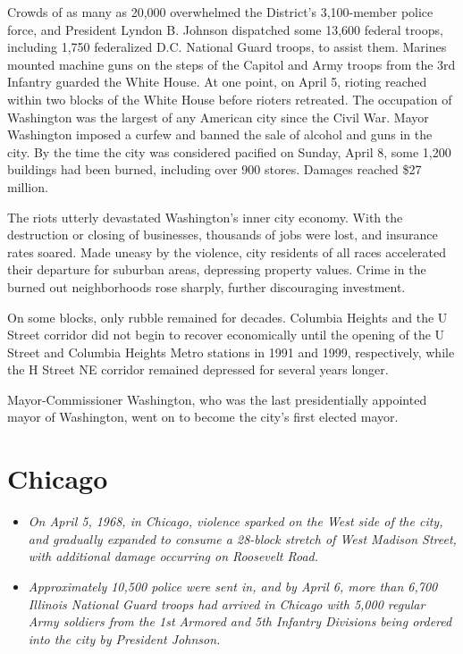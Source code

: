 Crowds of as many as 20,000 overwhelmed the District's 3,100-member
police force, and President Lyndon B. Johnson dispatched some 13,600
federal troops, including 1,750 federalized D.C. National Guard troops,
to assist them. Marines mounted machine guns on the steps of the Capitol
and Army troops from the 3rd Infantry guarded the White House. At one
point, on April 5, rioting reached within two blocks of the White House
before rioters retreated. The occupation of Washington was the largest
of any American city since the Civil War. Mayor Washington imposed a
curfew and banned the sale of alcohol and guns in the city. By the time
the city was considered pacified on Sunday, April 8, some 1,200
buildings had been burned, including over 900 stores. Damages reached
\$27 million.

The riots utterly devastated Washington's inner city economy. With the
destruction or closing of businesses, thousands of jobs were lost, and
insurance rates soared. Made uneasy by the violence, city residents of
all races accelerated their departure for suburban areas, depressing
property values. Crime in the burned out neighborhoods rose sharply,
further discouraging investment.

On some blocks, only rubble remained for decades. Columbia Heights and
the U Street corridor did not begin to recover economically until the
opening of the U Street and Columbia Heights Metro stations in 1991 and
1999, respectively, while the H Street NE corridor remained depressed
for several years longer.

Mayor-Commissioner Washington, who was the last presidentially appointed
mayor of Washington, went on to become the city's first elected mayor.

\section{Chicago}\label{chicago}

\begin{itemize}
\item
  \emph{On April 5, 1968, in Chicago, violence sparked on the West side
  of the city, and gradually expanded to consume a 28-block stretch of
  West Madison Street, with additional damage occurring on Roosevelt
  Road.}
\item
  \emph{Approximately 10,500 police were sent in, and by April 6, more
  than 6,700 Illinois National Guard troops had arrived in Chicago with
  5,000 regular Army soldiers from the 1st Armored and 5th Infantry
  Divisions being ordered into the city by President Johnson.}
\end{itemize}

